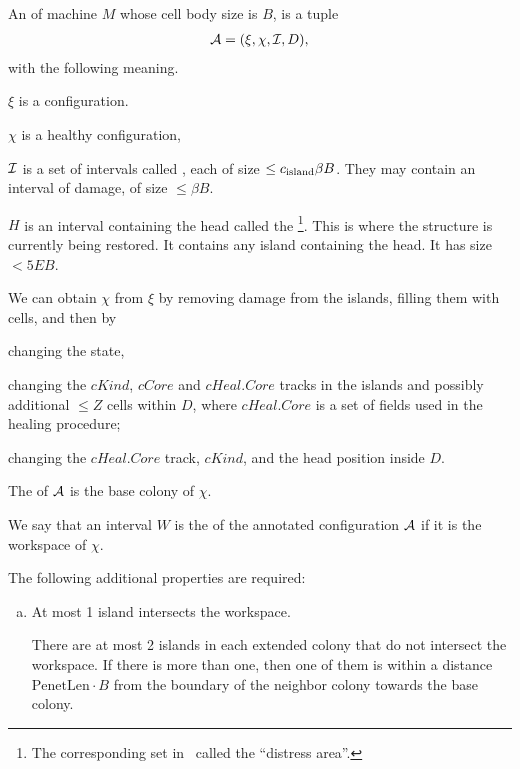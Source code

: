 \documentclass[12pt]{memoir}
\renewcommand{\le}{\leq}
\newcommand{\fld}[1]{\ensuremath{\textit{#1}}}
\def\B{B}
\newcommand{\D}{D}
\newcommand{\E}{E}
\renewcommand{\H}{H}
\newcommand{\PenetrationLen}{\mathrm{PenetLen}}
\newcommand{\Z}{Z}
\newcommand{\Core}{\fld{Core}}
\newcommand{\cCore}{\fld{cCore}}
\newcommand{\cKind}{\fld{cKind}}
\newcommand{\cHeal}{\fld{cHeal}}
\newcommand{\cns}[1]{c_{\textrm{\upshape #1}}}
\begin{document}
\begin{definition}\label{def:annotated-config}
  An  of machine \( M \) whose cell body size is \( \B \),
  is a tuple
  \begin{align*}
    \cA=(\xi,\chi, \cI, \D),
  \end{align*}
  with the following meaning.

  \( \xi \) is a configuration.

  \( \chi \) is a healthy configuration,

  \( \mathcal{I} \) is a set of intervals called , each of size \( \le \cns{island}\beta\B \).  %
  They may contain an interval of damage, of size \( \le\beta\B \).

  \( \H \) is an interval containing the head called the \footnote{The corresponding 
set in~\cite{burstyTuring13} called the ``distress area''.}.
  This is where the structure is currently being restored.
  It contains any island containing the head.
  It has size \( <5\E\B \). %

  We can obtain \( \chi \) from \( \xi \) by removing damage from the islands,
  filling them with cells, and then by
  \begin{bullets}
  \item changing the state,
  \item changing the \( \cKind \), \( \cCore \)  and \( \cHeal.\Core \) tracks
    in the islands and possibly
    additional \( \le \Z \) cells within \( \D \), where
    \( \cHeal.\Core \) is a set of fields used in the healing  procedure;
  \item changing the \( \cHeal.\Core \) track,  \( \cKind \),
    and the head position inside \( \D \).
  \end{bullets}
  The  of \( \mathcal{A} \) is the base colony of \( \chi \).

  We say that an interval \( W \) is the  of the annotated
  configuration \( \mathcal{A} \) if it is the workspace of \( \chi \).

  The following additional properties are required:
  \begin{enumerate}[(a)]
  \item \label{i:annotated-config.islands}
    At most 1 island intersects the workspace.

    There are at most 2 islands in each extended colony
    that do not intersect the workspace.
    If there is more than one, then one of them is within
    a distance \( \PenetrationLen\cdot\B \) from the boundary of the neighbor colony
    towards the base colony.


\end{enumerate}
\end{definition}
\end{document}
